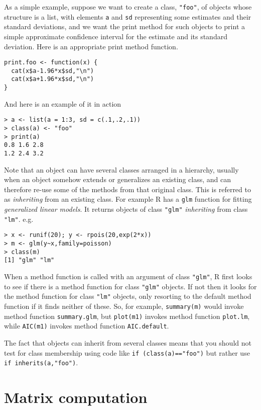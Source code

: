 \documentclass[10pt] {article}
\theoremstyle{definition}
\begin{document}
As a simple example, suppose we want to create a class, \lstinline+"foo"+, of objects whose structure is a list, with elements {\tt a} and {\tt sd} representing some estimates and their standard deviations, and we want the print method for such objects to print a simple approximate confidence interval for the estimate and its standard deviation. Here is an appropriate print method function.
\begin{lstlisting}
print.foo <- function(x) {
  cat(x$a-1.96*x$sd,"\n")
  cat(x$a+1.96*x$sd,"\n")
}
\end{lstlisting}
And here is an example of it in action
\begin{lstlisting}
> a <- list(a = 1:3, sd = c(.1,.2,.1))
> class(a) <- "foo"
> print(a)
0.8 1.6 2.8 
1.2 2.4 3.2
\end{lstlisting}
Note that an object can have several classes arranged in a hierarchy, usually when an object somehow extends or generalizes an existing class, and can therefore re-use some of the methods from that original class. This is referred to as {\em inheriting} from an existing class. For example R has a {\tt glm} function for fitting {\em generalized linear models}. It returns objects of class \lstinline+"glm"+ {\em inheriting} from class \lstinline+"lm"+. e.g.
\begin{lstlisting}
> x <- runif(20); y <- rpois(20,exp(2*x))
> m <- glm(y~x,family=poisson)
> class(m)
[1] "glm" "lm"
\end{lstlisting}
When a method function is called with an argument of class \lstinline+"glm"+, R first looks to see if there is a method function for class  \lstinline+"glm"+ objects. If not then it looks for the method function for class \lstinline+"lm"+ objects, only resorting to the default method function if it finds neither of these. So, for example, \lstinline+summary(m)+ would invoke method function \lstinline+summary.glm+, but \lstinline+plot(m1)+ invokes method function \lstinline+plot.lm+, while \lstinline+AIC(m1)+ invokes method function \lstinline+AIC.default+. 

The fact that objects can inherit from several classes means that you should not test for class membership using code like \lstinline+if (class(a)=="foo")+ but rather use \lstinline+if inherits(a,"foo")+. 

\section{Matrix computation \label{sec:matrix}}
\end{document}
